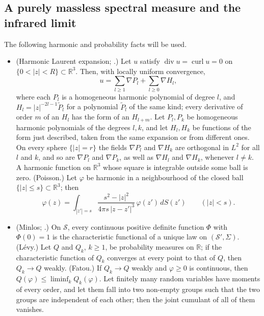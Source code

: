 \documentclass[11pt]{amsart}
\theoremstyle{definition}
\begin{document}
\subsection{A purely massless spectral measure and the infrared limit}
The following harmonic and probability facts will be used.
\begin{itemize}
\item[(K20)] (Harmonic Laurent expansion; \cite[Theorems~10.1 and~1.21; Chapter~5]{AxlerBourdonRamey}.) Let $u$ satisfy $\operatorname{div}u=\operatorname{curl}u=0$ on $\{0<|z|<R\}\subset\mathbb R^3$.
Then, with locally uniform convergence,
\begin{equation*}
u=\sum_{l\ge1}\nabla P_l+\sum_{l\ge0}\nabla H_l,
\end{equation*}
where each $P_l$ is a homogeneous harmonic polynomial of degree $l$, and $H_l=|z|^{-2l-1}\tilde P_l$ for a polynomial $\tilde P_l$ of the same kind;
every derivative of order $m$ of an $H_l$ has the form of an $H_{l+m}$.
Let $P_l,P_k$ be homogeneous harmonic polynomials of the degrees $l,k$, and let $H_l,H_k$ be functions of the form just described, taken from the same expansion or from different ones.
On every sphere $\{|z|=r\}$ the fields $\nabla P_l$ and $\nabla H_k$ are orthogonal in $L^2$ for all $l$ and $k$, and so are $\nabla P_l$ and $\nabla P_k$, as well as $\nabla H_l$ and $\nabla H_k$, whenever $l\ne k$.
A harmonic function on $\mathbb R^3$ whose square is integrable outside some ball is zero.
(Poisson.) Let $\varphi$ be harmonic in a neighbourhood of the closed ball $\{|z|\le s\}\subset\mathbb R^3$;
then
\begin{equation*}
\varphi(z)=\int_{|z'|=s}\frac{s^2-|z|^2}{4\pi s\,|z-z'|^3}\,\varphi(z')\,dS(z')\qquad(|z|<s).
\end{equation*}
\item[(K21)] (Minlos; \cite[Theorem~1]{FageotAminiUnser2014}.) On $\mathcal S$, every continuous positive definite function $\Phi$ with $\Phi(0)=1$ is the characteristic functional of a unique law on $(\mathcal S',\Sigma)$.
(L\'evy.) Let $Q$ and $Q_k$, $k\ge1$, be probability measures on $\mathbb R$;
if the characteristic function of $Q_k$ converges at every point to that of $Q$, then $Q_k\to Q$ weakly.
(Fatou.) If $Q_k\to Q$ weakly and $\varphi\ge0$ is continuous, then $Q(\varphi)\le\liminf_kQ_k(\varphi)$.
Let finitely many random variables have moments of every order, and let them fall into two non-empty groups such that the two groups are independent of each other;
then the joint cumulant of all of them vanishes.
\end{itemize}
\end{document}
